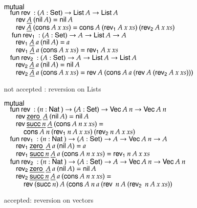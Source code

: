 \begin{figure}[htp]
$\mathsf{mutual}\: $  \\
$ \hspace*{3mm} \mathsf{fun}\: \mathsf{rev}\: : ( A : \mathsf{Set} ) \rightarrow{\mathsf{List}\:A \rightarrow\mathsf{List}\:A} $ \\
$ \spc \spc \rev \inacc{A} \: (\nil A ) = \nil A$\\
$ \spc \spc \rev \inacc{A} \: (\cons A \:x  \: xs) = \cons A \: (\reva A \: x \: xs) \: (\revb A \: x \: xs)$\\
$\ \hspace*{3mm} \mathsf{fun}\: \mathsf{rev_1}\: : ( A  : \mathsf{Set} ) \rightarrow{A  \rightarrow\mathsf{List}\:A \rightarrow A}$\\
$ \spc \spc \reva \inacc{A} \: a \: (\nil A ) = a$ \\
$\spc \spc \reva \inacc{A} \: a \: (\cons A \: x \: xs) = \reva A \: x \: xs$\\
$\hspace*{3mm} \mathsf{fun}\: \mathsf{rev_2}\: : ( A : \mathsf{Set} ) \rightarrow{ A \rightarrow\mathsf{List}\:A \rightarrow\mathsf{List}\:A} $\\
$\spc \spc \revb \inacc{A} \: a \: (\nil A ) = \nil A $\\
$\spc \spc \revb \inacc{A} \: a \: (\cons A\:  x \: xs) = \rev A \: (\cons A \: a \: (\rev A \: (\revb A \: x \: xs)))$
\caption{not accepted : reversion on Lists}  
\label{lrev}
\end{figure}

\begin{figure}[htp] 
$\mathsf{mutual}\: $ \\
$\hspace*{3mm} \mathsf{fun}\: \mathsf{rev}\: : ( n : \mathsf{Nat}\:  ) \rightarrow{( A : \mathsf{Set}) \rightarrow{\mathsf{Vec}\:A \: n \rightarrow\mathsf{Vec}\:A \: n}}$\\
$\spc \spc \rev \inacc{\zero} \: \inacc{A}  \: (\nil A) = \nil A $\\
$\spc \spc \rev \inacc{\suc n} \: \inacc{A} \: (\cons A \: n \: x \: xs) = $\\
$\spcx \cons A \: n \: (\reva n \: A \: x \: xs) \: (\revb n \: A \: x \: xs) $ \\
$\hspace*{3mm} \mathsf{fun}\: \mathsf{rev_1}\: : ( n : \mathsf{Nat}\: ) \rightarrow( A : \mathsf{Set} ) \rightarrow{A \rightarrow\mathsf{Vec}\:A \: n \rightarrow A}$\\
$\spc \spc \reva \inacc{\zero} \: \inacc{A} \: a \: (\nil A) = a $\\
$\spc \spc \reva \inacc{\suc n} \: \inacc{A} \: a \: (\cons A \: n \: x \: xs) = \reva n \: A \: x \: xs $\\
$\hspace*{3mm} \mathsf{fun}\: \mathsf{rev_2}\: : ( n : \mathsf{Nat}\: ) \rightarrow{( A : \mathsf{Set}) \rightarrow{A \rightarrow\mathsf{Vec}\:A \: n \rightarrow\mathsf{Vec}\:A \: n}}$\\
$ \spc \spc \revb \inacc{\zero} \: \inacc{A}  \: a \: (\nil A) = \nil A $\\
$ \spc \spc \revb \inacc{\suc n} \: \inacc{A} \: a \: (\cons A \: n \: x \: xs) = $\\
$ \spcx \rev (\suc n) \: A \: (\cons A \: n \: a \: (\rev \: n \: A \: (\revb \: n \: A \: x \: xs))$
\caption{accepted: reversion on vectors}  
\label{vref}
\end{figure}  

